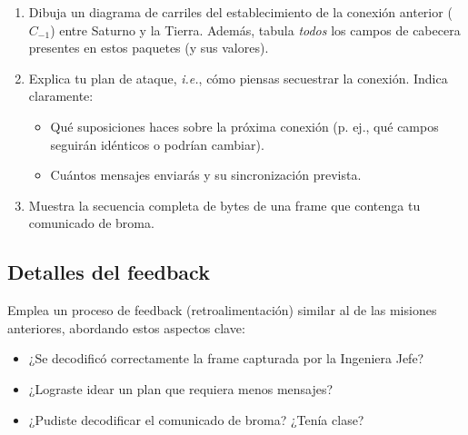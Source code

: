 \begin{enumerate}[itemsep=0.1cm]
\item Dibuja un diagrama de carriles del establecimiento de la conexión anterior ($C_{-1}$) entre Saturno y la Tierra.
Además, tabula \textit{todos} los campos de cabecera presentes en estos paquetes (y sus valores).

\item Explica tu plan de ataque, \textit{i.e.}, cómo piensas secuestrar la conexión. Indica claramente:
    \begin{itemize}
    \item Qué suposiciones haces sobre la próxima conexión (p. ej., qué campos seguirán idénticos o podrían cambiar).
    \item Cuántos mensajes enviarás y su sincronización prevista.
    \end{itemize}

\item Muestra la secuencia completa de bytes de una frame que contenga tu comunicado de broma.
\end{enumerate}

\subsection*{Detalles del feedback}

Emplea un proceso de feedback (retroalimentación) similar al de las misiones anteriores, abordando estos aspectos clave:
\begin{itemize}
\item ¿Se decodificó correctamente la frame capturada por la Ingeniera Jefe?
\item ¿Lograste idear un plan que requiera menos mensajes?
\item ¿Pudiste decodificar el comunicado de broma? ¿Tenía clase?
\end{itemize}

